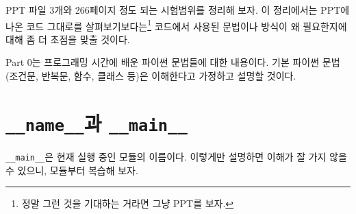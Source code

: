 \documentclass{scrartcl}
\title{\doctitle}
\author{Project Eclipse (19092 손량)}
\date{Last compiled on: \today, \currenttime}
\begin{document}
\maketitle

PPT 파일 3개와 266페이지 정도 되는 시험범위를 정리해 보자. 이 정리에서는 PPT에 나온 코드 그대로를 살펴보기보다는\footnote{정말 그런 것을 기대하는 거라면 그냥 PPT를 보자.} 코드에서 사용된 문법이나 방식이 왜 필요한지에 대해 좀 더 초점을 맞출 것이다.

Part 0는 프로그래밍 시간에 배운 파이썬 문법들에 대한 내용이다. 기본 파이썬 문법(조건문, 반복문, 함수, 클래스 등)은 이해한다고 가정하고 설명할 것이다.

\section{\texttt{\_\_name\_\_}과 \texttt{\_\_main\_\_}}
\texttt{\_\_main\_\_}은 현재 실행 중인 모듈의 이름이다. 이렇게만 설명하면 이해가 잘 가지 않을 수 있으니, 모듈부터 복습해 보자.
\end{document}
